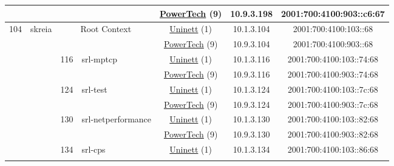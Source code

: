 \begin{small}
\begin{center}
\begin{longtable}{|c|c|c|c|c|c|c|c|}
  &  &  &  & \multicolumn{2}{|c|}{\tiny{\href{http://www.powertech.no}{PowerTech} (9)}} & \tiny{10.9.3.198} & \tiny{2001:700:4100:903::c6:67} \\ \hline
 \multirow{38}{*}{\tiny{104}} & \multicolumn{1}{|l|}{\multirow{38}{*}{\tiny{skreia}}} & \multicolumn{2}{|c|}{\multirow{2}{*}{\tiny{Root Context}}} & \multicolumn{2}{|c|}{\tiny{\href{https://www.uninett.no}{Uninett} (1)}} & \tiny{10.1.3.104} & \tiny{2001:700:4100:103::68} \\* \cline{5-5}\cline{6-6}\cline{7-7}\cline{8-8}
  &  & \multicolumn{2}{|c|}{} & \multicolumn{2}{|c|}{\tiny{\href{http://www.powertech.no}{PowerTech} (9)}} & \tiny{10.9.3.104} & \tiny{2001:700:4100:903::68} \\* \cline{3-3}\cline{4-4}\cline{5-5}\cline{6-6}\cline{7-7}\cline{8-8}
  &  & \multirow{2}{*}{\tiny{116}} & \multicolumn{1}{|l|}{\multirow{2}{*}{\tiny{srl-mptcp}}} & \multicolumn{2}{|c|}{\tiny{\href{https://www.uninett.no}{Uninett} (1)}} & \tiny{10.1.3.116} & \tiny{2001:700:4100:103::74:68} \\* \cline{5-5}\cline{6-6}\cline{7-7}\cline{8-8}
  &  &  &  & \multicolumn{2}{|c|}{\tiny{\href{http://www.powertech.no}{PowerTech} (9)}} & \tiny{10.9.3.116} & \tiny{2001:700:4100:903::74:68} \\* \cline{3-3}\cline{4-4}\cline{5-5}\cline{6-6}\cline{7-7}\cline{8-8}
  &  & \multirow{2}{*}{\tiny{124}} & \multicolumn{1}{|l|}{\multirow{2}{*}{\tiny{srl-test}}} & \multicolumn{2}{|c|}{\tiny{\href{https://www.uninett.no}{Uninett} (1)}} & \tiny{10.1.3.124} & \tiny{2001:700:4100:103::7c:68} \\* \cline{5-5}\cline{6-6}\cline{7-7}\cline{8-8}
  &  &  &  & \multicolumn{2}{|c|}{\tiny{\href{http://www.powertech.no}{PowerTech} (9)}} & \tiny{10.9.3.124} & \tiny{2001:700:4100:903::7c:68} \\* \cline{3-3}\cline{4-4}\cline{5-5}\cline{6-6}\cline{7-7}\cline{8-8}
  &  & \multirow{2}{*}{\tiny{130}} & \multicolumn{1}{|l|}{\multirow{2}{*}{\tiny{srl-netperformance}}} & \multicolumn{2}{|c|}{\tiny{\href{https://www.uninett.no}{Uninett} (1)}} & \tiny{10.1.3.130} & \tiny{2001:700:4100:103::82:68} \\* \cline{5-5}\cline{6-6}\cline{7-7}\cline{8-8}
  &  &  &  & \multicolumn{2}{|c|}{\tiny{\href{http://www.powertech.no}{PowerTech} (9)}} & \tiny{10.9.3.130} & \tiny{2001:700:4100:903::82:68} \\* \cline{3-3}\cline{4-4}\cline{5-5}\cline{6-6}\cline{7-7}\cline{8-8}
  &  & \multirow{2}{*}{\tiny{134}} & \multicolumn{1}{|l|}{\multirow{2}{*}{\tiny{srl-cps}}} & \multicolumn{2}{|c|}{\tiny{\href{https://www.uninett.no}{Uninett} (1)}} & \tiny{10.1.3.134} & \tiny{2001:700:4100:103::86:68} \\* \cline{5-5}\cline{6-6}\cline{7-7}\cline{8-8}

\end{longtable}
\end{center}
\end{small}
